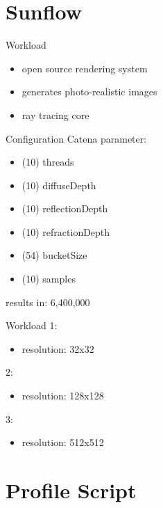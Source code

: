 \documentclass[11pt,aspectratio=169]{beamer}
\begin{document}
\section{Sunflow}

\begin{frame}{Workload}
  \begin{itemize}
    \item open source rendering system
    \item generates photo-realistic images
    \item ray tracing core
  \end{itemize}

\end{frame}

\begin{frame}{Configuration}
  Catena parameter:
  \begin{itemize}
    \item (10) threads
    \item (10) diffuseDepth
    \item (10) reflectionDepth
    \item (10) refractionDepth
    \item (54) bucketSize
    \item (10) samples
  \end{itemize}
  results in: 6,400,000
\end{frame}

\begin{frame}{Workload}
  1: 
  \begin{itemize}
    \item resolution: 32x32
  \end{itemize}
  2: 
  \begin{itemize}
    \item resolution: 128x128
  \end{itemize}
  3: 
  \begin{itemize}
    \item resolution: 512x512
  \end{itemize}
\end{frame}

\section{Profile Script}
\end{document}
